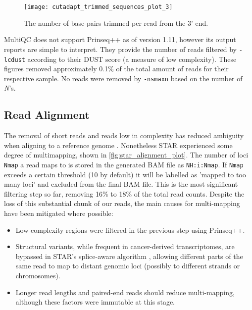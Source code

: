 \begin{figure}[!h]
    \centering
    \texttt{[image: cutadapt\_trimmed\_sequences\_plot\_3]}
    \caption{The number of base-pairs trimmed per read from the 3' end.} 
    \label{fig:cutadapt_trimmed_sequences_plot_3}
\end{figure}
\newpage

MultiQC does not support Prinseq++ as of version 1.11, however its output reports are simple to interpret. They provide the number of reads filtered by \texttt{-lc\textunderscore dust} according to their DUST score (a measure of low complexity). These figures removed approximately 0.1\% of the total amount of reads for their respective sample. No reads were removed by \texttt{-ns\textunderscore max\textunderscore n} based on the number of \textit{N}'s.



\subsection{Read Alignment}
The removal of short reads and reads low in complexity has reduced ambiguity when aligning to a reference genome \citep{rhoads2015pacbio}. Nonetheless STAR experienced some degree of multimapping, shown in \autoref{fig:star_alignment_plot}. The number of loci \texttt{Nmap} a read maps to is stored in the generated BAM file as \texttt{NH:i:Nmap}. If \texttt{Nmap} exceeds a certain threshold (10 by default) it will be labelled as 'mapped to too many loci' and excluded from the final BAM file. This is the most significant filtering step so far, removing 16\% to 18\% of the total read counts. Despite the loss of this substantial chunk of our reads, the main causes \citep{rhoads2015pacbio} for multi-mapping have been mitigated where possible: 
\begin{itemize}
\item[] Low-complexity regions were filtered in the previous step using Prinseq++.
\item[] Structural variants, while frequent in cancer-derived transcriptomes, are bypassed in STAR's splice-aware algorithm \citep{Dobin2013}, allowing different parts of the same read to map to distant genomic loci (possibly to different strands or chromosomes).
\item[] Longer read lengths and paired-end reads should reduce multi-mapping, although these factors were immutable at this stage.
\end{itemize}


